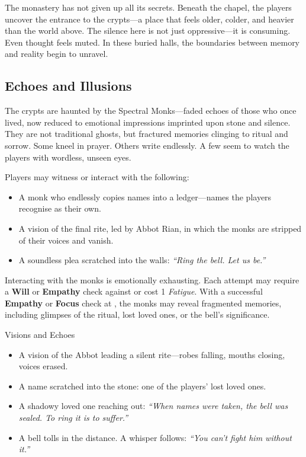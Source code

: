 The monastery has not given up all its secrets. Beneath the chapel, the players uncover the entrance to the crypts—a place that feels older, colder, and heavier than the world above. The silence here is not just oppressive—it is consuming. Even thought feels muted. In these buried halls, the boundaries between memory and reality begin to unravel.

\subsection{Echoes and Illusions}

The crypts are haunted by the Spectral Monks—faded echoes of those who once lived, now reduced to emotional impressions imprinted upon stone and silence. They are not traditional ghosts, but fractured memories clinging to ritual and sorrow. Some kneel in prayer. Others write endlessly. A few seem to watch the players with wordless, unseen eyes.

Players may witness or interact with the following:
\begin{Example}{}
    \begin{itemize}\raggedright
        \item A monk who endlessly copies names into a ledger—names the players recognise as their own.
        \item A vision of the final rite, led by Abbot Rian, in which the monks are stripped of their voices and vanish.
        \item A soundless plea scratched into the walls: \emph{“Ring the bell. Let us be.”}
    \end{itemize}
\end{Example}

Interacting with the monks is emotionally exhausting. Each attempt may require a \textbf{Will} or \textbf{Empathy} check against  or cost 1 \emph{Fatigue}. With a successful \textbf{Empathy} or \textbf{Focus} check at , the monks may reveal fragmented memories, including glimpses of the ritual, lost loved ones, or the bell’s significance.

\begin{Example}{Visions and Echoes}
    \begin{itemize}
        \item A vision of the Abbot leading a silent rite—robes falling, mouths closing, voices erased.
        \item A name scratched into the stone: one of the players’ lost loved ones.
        \item A shadowy loved one reaching out: \emph{“When names were taken, the bell was sealed. To ring it is to suffer.”}
        \item A bell tolls in the distance. A whisper follows: \emph{“You can’t fight him without it.”}
    \end{itemize}
\end{Example}

